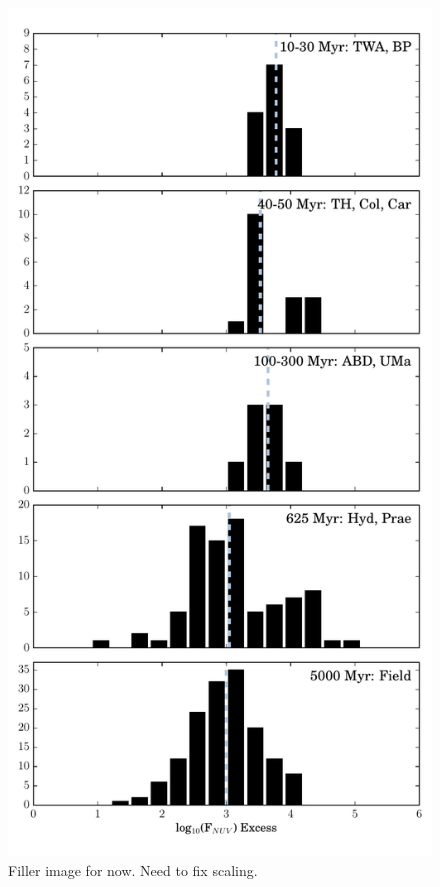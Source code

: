 \documentclass[twocolumn]{aastex62}
\begin{document}
\begin{figure}[t]
\centering
\includegraphics[width=\linewidth]{histfd_NUV.pdf}
\caption{Filler image for now. Need to fix scaling. \label{fig:histfd}}
\end{figure}
\end{document}
